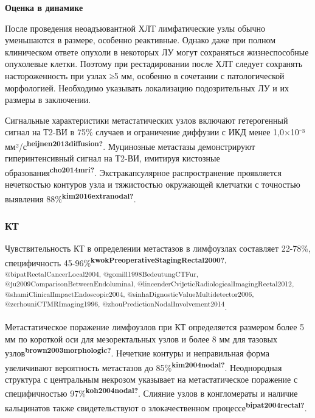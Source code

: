 \documentclass[
  russian,
  12pt,
  a4paper,
]{report}
\begin{document}
\textbf{Оценка в динамике}

После проведения неоадъювантной ХЛТ лимфатические узлы обычно
уменьшаются в размере, особенно реактивные. Однако даже при полном
клиническом ответе опухоли в некоторых ЛУ могут сохраняться
жизнеспособные опухолевые клетки. Поэтому при рестадировании после ХЛТ
следует сохранять настороженность при узлах ≥5 мм, особенно в сочетании
с патологической морфологией. Необходимо указывать локализацию
подозрительных ЛУ и их размеры в заключении.

Сигнальные характеристики метастатических узлов включают гетерогенный
сигнал на Т2-ВИ в 75\% случаев и ограничение диффузии с ИКД менее
1,0×10⁻³ мм²/с\textsuperscript{\textbf{heijnen2013diffusion?}}.
Муцинозные метастазы демонстрируют гиперинтенсивный сигнал на Т2-ВИ,
имитируя кистозные образования\textsuperscript{\textbf{cho2014mri?}}.
Экстракапсулярное распространение проявляется нечеткостью контуров узла
и тяжистостью окружающей клетчатки с точностью выявления
88\%\textsuperscript{\textbf{kim2016extranodal?}}.

\subsubsection{}\label{section}

\subsubsection{КТ}\label{ux43aux442-1}

Чувствительность КТ в определении метастазов в лимфоузлах составляет
22-78\%, специфичность
45-96\%\textsuperscript{\textbf{kwokPreoperativeStagingRectal2000?},
@bipatRectalCancerLocal2004, @gomill1998BedeutungCTFur,
@ju2009ComparisonBetweenEndoluminal,
@lincenderCvijeticRadiologicalImagingRectal2012,
@shamiClinicalImpactEndoscopic2004,
@sinhaDignosticValueMultidetector2006, @zerhouniCTMRImaging1996,
@zhouPredictionNodalInvolvement2014}.

Метастатическое поражение лимфоузлов при КТ определяется размером более
5 мм по короткой оси для мезоректальных узлов и более 8 мм для тазовых
узлов\textsuperscript{\textbf{brown2003morphologic?}}. Нечеткие контуры
и неправильная форма увеличивают вероятность метастазов до
85\%\textsuperscript{\textbf{kim2004nodal?}}. Неоднородная структура с
центральным некрозом указывает на метастатическое поражение с
специфичностью 97\%\textsuperscript{\textbf{koh2004nodal?}}. Слияние
узлов в конгломераты и наличие кальцинатов также свидетельствуют о
злокачественном процессе\textsuperscript{\textbf{bipat2004rectal?}}.
\end{document}
